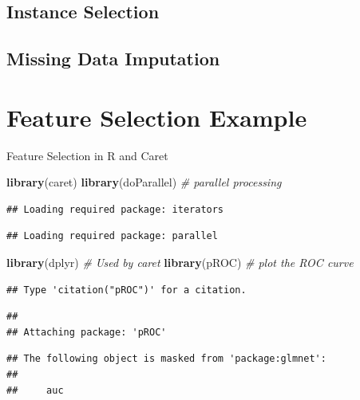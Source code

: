 \documentclass[]{book}
\newenvironment{Shaded}{\begin{snugshade}}{\end{snugshade}}
\newcommand{\KeywordTok}[1]{\textcolor[rgb]{0.13,0.29,0.53}{\textbf{{#1}}}}
\newcommand{\CommentTok}[1]{\textcolor[rgb]{0.56,0.35,0.01}{\textit{{#1}}}}
\newcommand{\NormalTok}[1]{{#1}}
\begin{document}
\section{Instance Selection}\label{instance-selection-1}

\section{Missing Data Imputation}\label{missing-data-imputation}

\chapter{Feature Selection Example}\label{feature-selection-example}

Feature Selection in R and Caret

\begin{Shaded}
\begin{Highlighting}[]
\KeywordTok{library}\NormalTok{(caret)}
\KeywordTok{library}\NormalTok{(doParallel) }\CommentTok{# parallel processing}
\end{Highlighting}
\end{Shaded}

\begin{verbatim}
## Loading required package: iterators
\end{verbatim}

\begin{verbatim}
## Loading required package: parallel
\end{verbatim}

\begin{Shaded}
\begin{Highlighting}[]
\KeywordTok{library}\NormalTok{(dplyr) }\CommentTok{# Used by caret}
\KeywordTok{library}\NormalTok{(pROC) }\CommentTok{# plot the ROC curve}
\end{Highlighting}
\end{Shaded}

\begin{verbatim}
## Type 'citation("pROC")' for a citation.
\end{verbatim}

\begin{verbatim}
## 
## Attaching package: 'pROC'
\end{verbatim}

\begin{verbatim}
## The following object is masked from 'package:glmnet':
## 
##     auc
\end{verbatim}
\end{document}
